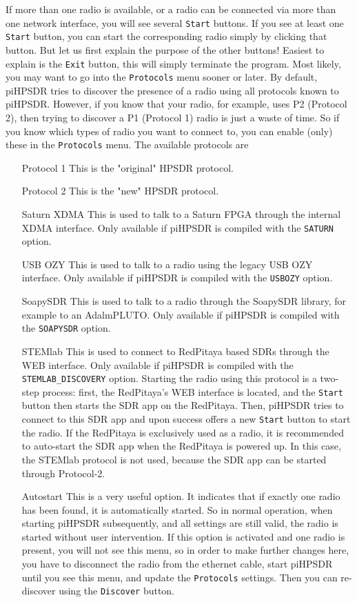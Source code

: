 \documentclass[12pt]{book}
\def\rett#1{\texttt{\color{red}#1}}
\begin{document}
If more than one radio is available, or a radio can be connected via more than one network interface,
you will see several \rett{Start} buttons.
If you see at least one \rett{Start} button, you can start the corresponding radio simply
by clicking that button. But let us first explain the
purpose of the other buttons! Easiest to explain is the \rett{Exit} button, this will simply terminate
the program. Most likely, you may want to go into the \rett{Protocols} menu sooner or later.
By default, piHPSDR tries to discover the presence of a radio using all protocols known to piHPSDR. However, 
if you know that your radio, for example, uses P2 (Protocol 2), then trying to discover a P1 (Protocol 1) 
radio is just a waste of time. So if you know which types of radio you want to connect to, you can enable 
(only) these in the \rett{Protocols} menu. The available protocols are

\begin{itemize}[font=\texttt, left=80pt]
\item[Protocol 1]{This is the "original" HPSDR protocol.}
\item[Protocol 2]{This is the "new" HPSDR protocol.}
\item[Saturn XDMA]{This is used to talk to a Saturn FPGA through the internal XDMA interface. Only available
if piHPSDR is compiled with the \texttt{SATURN}  option.}
\item[USB OZY]{This is used to talk to a radio using the legacy USB OZY interface. Only available if piHPSDR
is compiled with the \texttt{USBOZY} option.}
\item[SoapySDR]{This is used to talk to a radio through the SoapySDR library, for example to an AdalmPLUTO. 
Only available if piHPSDR is compiled with the \texttt{SOAPYSDR} option.}
\item[STEMlab]{This is used to connect to RedPitaya based SDRs through the WEB interface. Only available if 
piHPSDR is compiled with the \texttt{STEMLAB\_DISCOVERY} option. Starting the radio using this protocol is a 
two-step process:
first, the RedPitaya's WEB interface is located, and the \texttt{Start} button then starts the SDR app
on the RedPitaya. Then, piHPSDR tries to connect to this SDR app and upon success offers a new
\texttt{Start} button to start the radio. If the RedPitaya is exclusively used as a radio, it is recommended 
to auto-start the SDR app
when the RedPitaya is powered up. In this case, the STEMlab protocol is not used, because the SDR app can be started through Protocol-2.}
\item[Autostart]{This is a very useful option. It indicates that if exactly one radio has been found, it is 
automatically started. So in normal operation, when starting piHPSDR subsequently, and all settings are 
still valid, the radio is started without user intervention. If this option is activated and one radio is 
present, you will not see this menu, so in order to make further changes here, you have to disconnect the 
radio from the ethernet cable, start piHPSDR until you see this menu, and update the \rett{Protocols}
settings. Then you can re-discover using the \rett{Discover} button.}
\end{itemize}
\end{document}
